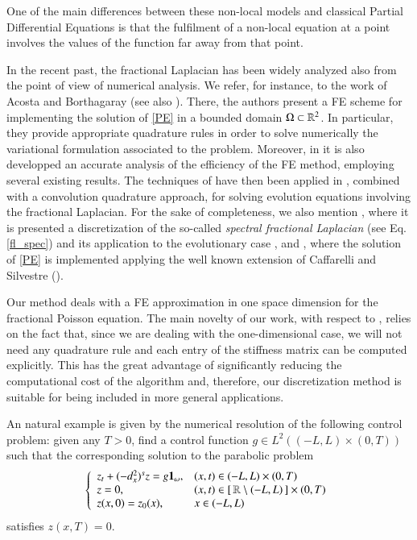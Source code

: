 One of the main differences between these non-local models and classical Partial Differential Equations is that the fulfilment of a non-local equation at a point involves the values of the function far away from that point.

In the recent past, the fractional Laplacian has been widely analyzed also from the point of view of numerical analysis. We refer, for instance, to the work \cite{acosta2017fractional} of Acosta and Borthagaray (see also \cite{acosta2017short}). There, the authors present a FE scheme for implementing the solution of \eqref{PE} in a bounded domain $\Omega\subset\mathbb{R}^2$. In particular, they provide appropriate quadrature rules in order to solve numerically the variational formulation associated to the problem. Moreover, in \cite{acosta2017fractional} it is also developped an accurate analysis of the efficiency of the FE method, employing several existing results. The techniques of \cite{acosta2017short,acosta2017fractional} have then been applied in \cite{acosta2017finite}, combined with a convolution quadrature approach, for solving evolution equations involving the fractional Laplacian. For the sake of completeness, we also mention \cite{bonito2015numerical}, where it is presented a discretization of the so-called \textit{spectral fractional Laplacian} (see Eq. \eqref{fl_spec}) and its application to the evolutionary case \cite{bonito2017approximation}, and \cite{nochetto2015pde}, where the solution of \eqref{PE} is implemented applying the well known extension of Caffarelli and Silvestre (\cite{caffarelli2007extension}).   

Our method deals with a FE approximation in one space dimension for the fractional Poisson equation. The main novelty of our work, with respect to \cite{acosta2017short,acosta2017fractional}, relies on the fact that, since we are dealing with the one-dimensional case, we will not need any quadrature rule and each entry of the stiffness matrix can be computed explicitly. This has the great advantage of significantly reducing the computational cost of the algorithm and, therefore, our discretization method is suitable for being included in more general applications.  

An natural example is given by the numerical resolution of the following control problem: given any $T>0$, find a control function $g\in L^2((-L,L)\times(0,T))$ such that the corresponding solution to the parabolic problem 
\begin{align}\label{heat_frac}
	\left\{\begin{array}{ll}
	z_t + (-d_x^2)^{s}z = g\mathbf{1}_{\omega}, & (x,t)\in (-L,L)\times(0,T)
	\\
	z=0, & (x,t)\in[\,\mathbb{R}\setminus (-L,L)\,]\times(0,T)
	\\
	z(x,0)=z_0(x), & x\in (-L,L)
	\end{array}\right.
\end{align} 
satisfies $z(x,T)=0$. 

